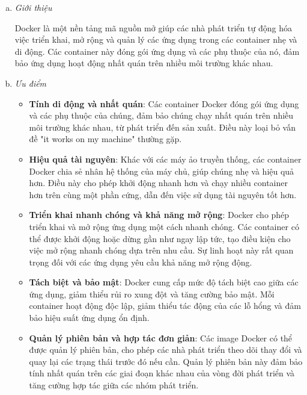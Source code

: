     \begin{enumerate}[(a)]
        \item \textit{Giới thiệu}

        Docker là một nền tảng mã nguồn mở giúp các nhà phát triển tự động hóa việc triển khai, mở rộng và quản lý các ứng dụng trong các container nhẹ và di động. Các container này đóng gói ứng dụng và các phụ thuộc của nó, đảm bảo ứng dụng hoạt động nhất quán trên nhiều môi trường khác nhau.
        
        \item \textit{Ưu điểm} \cite{DockerAdvantages}

        \begin{itemize}
            \item \textbf{Tính di động và nhất quán}: Các container Docker đóng gói ứng dụng và các phụ thuộc của chúng, đảm bảo chúng chạy nhất quán trên nhiều môi trường khác nhau, từ phát triển đến sản xuất. Điều này loại bỏ vấn đề "it works on my machine" thường gặp. 
            \item \textbf{Hiệu quả tài nguyên}: Khác với các máy ảo truyền thống, các container Docker chia sẻ nhân hệ thống của máy chủ, giúp chúng nhẹ và hiệu quả hơn. Điều này cho phép khởi động nhanh hơn và chạy nhiều container hơn trên cùng một phần cứng, dẫn đến việc sử dụng tài nguyên tốt hơn. 
            \item \textbf{Triển khai nhanh chóng và khả năng mở rộng}: Docker cho phép triển khai và mở rộng ứng dụng một cách nhanh chóng. Các container có thể được khởi động hoặc dừng gần như ngay lập tức, tạo điều kiện cho việc mở rộng nhanh chóng dựa trên nhu cầu. Sự linh hoạt này rất quan trọng đối với các ứng dụng yêu cầu khả năng mở rộng động.
            \item \textbf{Tách biệt và bảo mật}: Docker cung cấp mức độ tách biệt cao giữa các ứng dụng, giảm thiểu rủi ro xung đột và tăng cường bảo mật. Mỗi container hoạt động độc lập, giảm thiểu tác động của các lỗ hổng và đảm bảo hiệu suất ứng dụng ổn định.
            \item \textbf{Quản lý phiên bản và hợp tác đơn giản}: Các image Docker có thể được quản lý phiên bản, cho phép các nhà phát triển theo dõi thay đổi và quay lại các trạng thái trước đó nếu cần. Quản lý phiên bản này đảm bảo tính nhất quán trên các giai đoạn khác nhau của vòng đời phát triển và tăng cường hợp tác giữa các nhóm phát triển.
        \end{itemize}
        

\end{enumerate}
